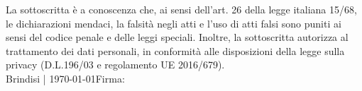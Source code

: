 \documentclass[10pt,a4paper]{moderncv}		%
\begin{document}


\vspace{\fill}
{\footnotesize\noindent
La sottoscritta è a conoscenza che, ai sensi dell'art. 26 della legge italiana 15/68, le dichiarazioni mendaci, la falsità negli atti e l'uso di atti falsi sono puniti ai sensi del codice penale e delle leggi speciali. Inoltre, la sottoscritta autorizza al trattamento dei dati personali, in conformità alle disposizioni della legge sulla privacy  (D.L.196/03 e regolamento UE 2016/679).}
\vspace*{0.8cm}\\
Brindisi | \today\hfill Firma: 
\end{document}
